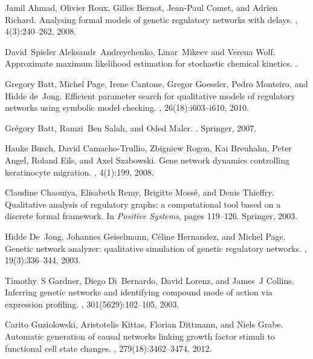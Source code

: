 \documentclass[runningheads,a4paper]{llncs}
\begin{document}
%
%
\begin{thebibliography}{10}

Jamil Ahmad, Olivier Roux, Gilles Bernot, Jean-Paul Comet, and Adrien Richard.
\newblock Analysing formal models of genetic regulatory networks with delays.
, 4(3):240--262, 2008.

David~Spieler Aleksandr~Andreychenko, Linar~Mikeev and Verena Wolf.
\newblock Approximate maximum likelihood estimation for stochastic chemical
  kinetics.
.

Gregory Batt, Michel Page, Irene Cantone, Gregor Goessler, Pedro Monteiro, and
  Hidde de~Jong.
\newblock Efficient parameter search for qualitative models of regulatory
  networks using symbolic model checking.
, 26(18):i603--i610, 2010.

Gr{\'e}gory Batt, Ramzi~Ben Salah, and Oded Maler.
.
\newblock Springer, 2007.

Hauke Busch, David Camacho-Trullio, Zbigniew Rogon, Kai Breuhahn, Peter Angel,
  Roland Eils, and Axel Szabowski.
\newblock Gene network dynamics controlling keratinocyte migration.
, 4(1):199, 2008.

Claudine Chaouiya, Elisabeth Remy, Brigitte Moss{\'e}, and Denis Thieffry.
\newblock Qualitative analysis of regulatory graphs: a computational tool based
  on a discrete formal framework.
\newblock In {\em Positive Systems}, pages 119--126. Springer, 2003.

Hidde De~Jong, Johannes Geiselmann, C{\'e}line Hernandez, and Michel Page.
\newblock Genetic network analyzer: qualitative simulation of genetic
  regulatory networks.
, 19(3):336--344, 2003.

Timothy~S Gardner, Diego Di~Bernardo, David Lorenz, and James~J Collins.
\newblock Inferring genetic networks and identifying compound mode of action
  via expression profiling.
, 301(5629):102--105, 2003.

Carito Guziolowski, Aristotelis Kittas, Florian Dittmann, and Niels Grabe.
\newblock Automatic generation of causal networks linking growth factor stimuli
  to functional cell state changes.
, 279(18):3462--3474, 2012.


\end{thebibliography}
\end{document}
